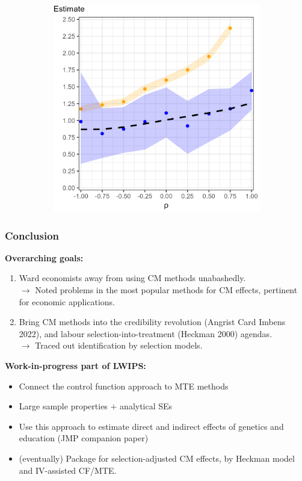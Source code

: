 \documentclass[dvipsnames,handout]{beamer} %
\begin{document}
\begin{frame}[noframenumbering]
\begin{figure}[h!]
\begin{subfigure}[c]{0.475\textwidth}
            \includegraphics[width=\textwidth]{
                ../programs/simulations/sim-output/rho-indirecteffect-bias.png}
        \end{subfigure}
    \end{figure}
\end{frame}
\begin{frame}
    \frametitle{Conclusion}
    \textbf{Overarching goals:}
    \begin{enumerate}
        \item Ward economists away from using CM methods unabashedly. \\ 
        $\to$ Noted problems in the most popular methods for CM effects, pertinent for economic applications.
        \pause
        \item Bring CM methods into the credibility revolution (Angrist Card Imbens 2022), and labour selection-into-treatment (Heckman 2000) agendas. \\
        $\to$ Traced out identification by selection models. 
    \end{enumerate}
    \textbf{Work-in-progress part of LWIPS:}
    \begin{itemize}
        \item Connect the control function approach to MTE methods
        \item Large sample properties $+$ analytical SEs
        \item Use this approach to estimate direct and indirect effects of genetics and education (JMP companion paper)
        \item (eventually) Package for selection-adjusted CM effects, by Heckman model and IV-assisted CF/MTE.
    \end{itemize}
\end{frame}
\end{document}

